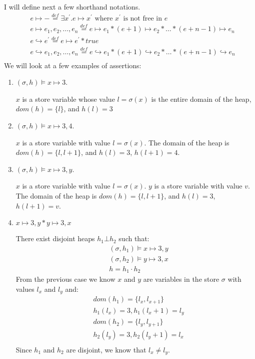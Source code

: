 \documentclass[12pt]{article}
\begin{document}
I will define next a few shorthand notations.
\begin{align*}
&e \mapsto - \mathop =\limits^{def} \exists x^\prime. e \mapsto x^\prime \mbox{ where } x^\prime \mbox{ is not free in } e \\
&e \mapsto e_1, e_2, \dots, e_n \mathop =\limits^{def} e \mapsto e_1 * (e+1) \mapsto e_2 * \dots * (e+n-1) \mapsto e_n \\
& e \hookrightarrow e^\prime \mathop =\limits^{def} e \mapsto e^\prime * true \\
&e \hookrightarrow e_1, e_2, \dots, e_n \mathop =\limits^{def} e \hookrightarrow e_1 * (e+1) \hookrightarrow e_2 * \dots * (e+n-1) \hookrightarrow e_n  \\
\end{align*}
We will look at a few examples of assertions:
\begin{enumerate}
\item $(\sigma,h) \vDash x \mapsto 3$. 

$x$ is a store variable whose value $l = \sigma(x)$ is the entire domain of the heap, $dom(h) = \{l\}$, and $h(l)=3$
\item $(\sigma,h) \vDash x \mapsto 3,4$. 

$x$ is a store variable with value $l = \sigma(x)$. The domain of the heap is $dom(h) = \{l,l+1\}$, and $h(l)=3$, $h(l+1)=4$.
\item $(\sigma,h) \vDash x \mapsto 3,y$. 

$x$ is a store variable with value $l = \sigma(x)$. $y$ is a store variable with value $v$. The domain of the heap is $dom(h) = \{l,l+1\}$, and $h(l)=3$, $h(l+1)=v$.
\item $x \mapsto 3,y * y \mapsto 3,x$

There exist disjoint heaps $h_1 \bot h_2$ such that: 
\begin{align*}
&(\sigma,h_1) \models x \mapsto 3,y\\
&(\sigma,h_2) \models y \mapsto 3,x\\
&h = h_1 \cdot h_2
\end{align*}
From the previous case we know $x$ and $y$ are variables in the store $\sigma$ with values $l_x$ and $l_y$ and:
\begin{align*}
&dom(h_1) = \{l_x,l_{x+1}\}\\
&h_1(l_x)=3, h_1(l_x+1) = l_y\\
&dom(h_2) = \{l_y,l_{y+1}\}\\
&h_2(l_y)=3, h_2(l_y+1) = l_x\\
\end{align*} 
Since $h_1$ and $h_2$ are disjoint, we know that $l_x \neq l_y$.


\end{enumerate}
\end{document}
